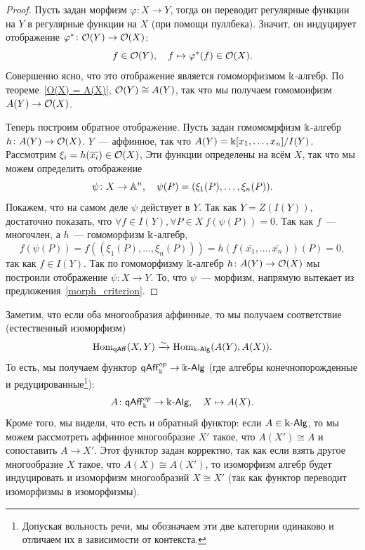 	    \begin{proof}
	    	Пусть задан морфизм $\varphi\colon X \to Y$, тогда он переводит регулярные функции на $Y$ в регулярные функции на $X$ (при помощи пуллбека). Значит, он индуцирует отображение $\varphi^*\colon \cO(Y) \to \cO(X)$:
	    	\[
	    		f \in \cO(Y), \quad f \mapsto \varphi^*(f) \in \cO(X).
	    	\]
	    	Совершенно ясно, что это отображение является гомоморфизмом $\bk$-алгебр. По теореме~\ref{O(X) = A(X)}, $\cO(Y) \cong A(Y)$, так что мы получаем гомомоифизм $A(Y) \to \cO(X)$. 

	    	Теперь построим обратное отображение. Пусть задан гомомомрфизм $\bk$-алгебр $h\colon A(Y) \to \cO(X)$. $Y$~--- аффинное, так что  $A(Y) = \bk[x_1, \ldots, x_n]/I(Y)$. Рассмотрим $\xi_i = h(\overline{x_i}) \in \cO(X)$, Эти функции определены на всём $X$, так что мы можем определить отображение 
	    	\[
	    		\psi\colon X \to \AA^n, \quad \psi(P) = (\xi_1(P), \ldots, \xi_n(P)).
	    	\]
	    	Покажем, что на самом деле $\psi$ действует в $Y$. Так как $Y = Z(I(Y))$,  достаточно показать, что $\forall f \in I(Y), \forall P \in X \ f(\psi(P)) = 0$. Так как $f$~--- многочлен, а $h$~--- гомоморфизм $\bk$-алгебр, 
	    	\[
	    	   	f(\psi(P)) = f((\xi_1(P), \ldots, \xi_n(P))) = h(f(\overline{x_1}, \ldots, \overline{x_n}))(P) = 0,
	    	   \]   
	    	так как $f \in I(Y)$. Так по гомоморфизму $\bk$-алгебр $h\colon A(Y) \to \cO(X)$ мы построили отображение $\psi\colon X \to Y$. То, что $\psi$~--- морфизм, напрямую вытекает из предложения~\ref{morph_criterion}.
	    \end{proof}
 
	    Заметим, что если оба многообразия аффинные, то мы получаем соответствие (естественный изоморфизм) 
	    \[
	    	\Hom_{\qAff}(X, Y) \xrightarrow{\sim} \Hom_{\Bbbk\text{-}\Alg}(A(Y), A(X)).
	    \]
	    То есть, мы получаем функтор $\qAff^{op}_{\Bbbk} \to \Bbbk\text{-}\Alg$ (где алгебры конечнопорожденные и редуцированные\footnote{Допуская вольность речи, мы обозначаем эти две категории одинаково и отличаем их в зависимости от контекста. }):
	    \[
	    	A\colon \qAff^{op}_{\Bbbk} \to \Bbbk\text{-}\Alg, \quad X \mapsto A(X).
	    \]
	    Кроме того, мы видели, что есть и обратный функтор: если $A \in \Bbbk\text{-}\Alg$, то мы можем рассмотреть аффинное многообразие $X'$ такое, что $A(X') \cong A$ и сопоставить $A \to X'$. Этот функтор задан корректно, так как если взять другое многообразие $X$ такое, что $A(X) \cong A(X')$, то изоморфизм алгебр будет индуцировать и изоморфизм многообразий $X \cong X'$ (так как функтор переводит изоморфизмы в изоморфизмы). 

